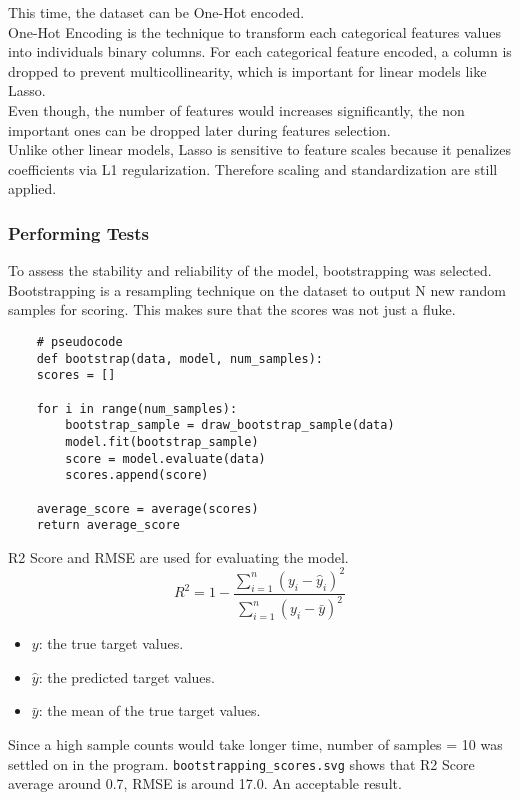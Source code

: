 \documentclass{report}
\begin{document}
This time, the dataset can be One-Hot encoded. \\
One-Hot Encoding is the technique to transform each categorical features values into individuals
binary columns. For each categorical feature encoded, a column is dropped to prevent multicollinearity,
which is important for linear models like Lasso. \\
Even though, the number of features would increases significantly, the non important ones can 
be dropped later during features selection. \\ 
Unlike other linear models, Lasso is sensitive to feature scales because it penalizes coefficients via 
L1 regularization. Therefore scaling and standardization are still applied.  

\subsubsection{Performing Tests}
To assess the stability and reliability of the model, bootstrapping was selected. Bootstrapping is a 
resampling technique on the dataset to output N new random samples for scoring. This makes sure that 
the scores was not just a fluke. \\
\begin{verbatim}
    # pseudocode
    def bootstrap(data, model, num_samples):
    scores = []
    
    for i in range(num_samples):
        bootstrap_sample = draw_bootstrap_sample(data)
        model.fit(bootstrap_sample)
        score = model.evaluate(data)
        scores.append(score)
    
    average_score = average(scores)
    return average_score
\end{verbatim}

R2 Score and RMSE are used for evaluating the model.
\[ R^2 = 1 - \frac{\sum_{i=1}^{n} (y_i - \hat{y}_i)^2}{\sum_{i=1}^{n} (y_i - \bar{y})^2} \]
\begin{itemize}
    \item \( y \): the true target values.
    \item \( \hat{y} \): the predicted target values.
    \item \( \bar{y} \): the mean of the true target values.
\end{itemize}

Since a high sample counts would take longer time, number of samples = 10 was settled on in the program.
\verb|bootstrapping_scores.svg| shows that R2 Score average around 0.7, RMSE is around 17.0. An 
acceptable result.
\end{document}
